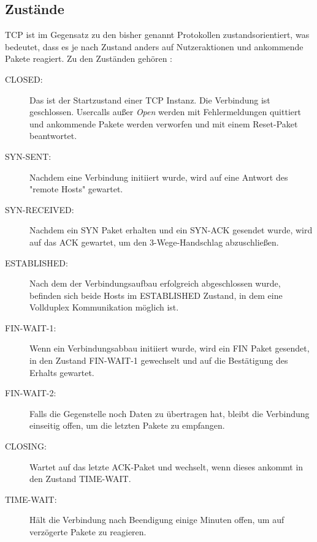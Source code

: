 \FloatBarrier
\subsection{Zustände}
TCP ist im Gegensatz zu den bisher genannt Protokollen zustandsorientiert, was bedeutet, dass es je nach Zustand anders auf Nutzeraktionen und ankommende Pakete reagiert. 
Zu den Zuständen gehören :\cite{TCPr,TCPm} 



\begin{description}

\item[CLOSED: ]Das ist der Startzustand einer TCP Instanz. Die Verbindung ist geschlossen. Usercalls außer \textit{Open} werden mit Fehlermeldungen quittiert und ankommende Pakete werden verworfen und mit einem Reset-Paket beantwortet.
\item[SYN-SENT: ]Nachdem eine Verbindung initiiert wurde, wird auf eine Antwort des {}"remote Hosts"{} gewartet. 
\item[SYN-RECEIVED: ] Nachdem ein SYN Paket erhalten und ein SYN-ACK gesendet wurde, wird auf das ACK gewartet, um den 3-Wege-Handschlag abzuschließen. 
\item[ESTABLISHED: ] Nach dem der Verbindungsaufbau erfolgreich abgeschlossen wurde, befinden sich beide Hosts im ESTABLISHED Zustand, in dem eine Vollduplex Kommunikation möglich ist. 
\item[FIN-WAIT-1: ] Wenn ein Verbindungsabbau initiiert wurde, wird ein FIN Paket gesendet, in den Zustand FIN-WAIT-1 gewechselt und auf die Bestätigung des Erhalts gewartet. 
\item[FIN-WAIT-2: ] Falls die Gegenstelle noch Daten zu übertragen hat, bleibt die Verbindung einseitig offen, um die letzten Pakete zu empfangen. 
\item[CLOSING: ]	Wartet auf das letzte ACK-Paket und wechselt, wenn dieses ankommt in den Zustand TIME-WAIT.
\item[TIME-WAIT: ] Hält die Verbindung nach Beendigung einige Minuten offen, um auf verzögerte Pakete zu reagieren.
\end{description}\cite{TCPr,TCPm} 

